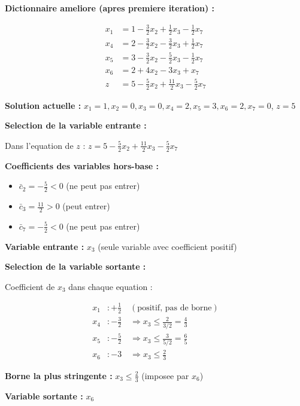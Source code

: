 \documentclass[12pt,a4paper]{article}
\begin{document}
\begin{exemple}
\textbf{Dictionnaire ameliore (apres premiere iteration) :}

\begin{align*}
x_1 &= 1 - \frac{3}{2}x_2 + \frac{1}{2}x_3 - \frac{1}{2}x_7\\
x_4 &= 2 - \frac{3}{2}x_2 - \frac{3}{2}x_3 + \frac{1}{2}x_7\\
x_5 &= 3 - \frac{3}{2}x_2 - \frac{5}{2}x_3 - \frac{1}{2}x_7\\
x_6 &= 2 + 4x_2 - 3x_3 + x_7\\
z &= 5 - \frac{5}{2}x_2 + \frac{11}{2}x_3 - \frac{5}{2}x_7
\end{align*}

\textbf{Solution actuelle :} $x_1 = 1, x_2 = 0, x_3 = 0, x_4 = 2, x_5 = 3, x_6 = 2, x_7 = 0$, $z = 5$
\end{exemple}

\begin{methode}
\textbf{Selection de la variable entrante :}

Dans l'equation de $z$ : $z = 5 - \frac{5}{2}x_2 + \frac{11}{2}x_3 - \frac{5}{2}x_7$

\textbf{Coefficients des variables hors-base :}
\begin{itemize}
    \item $\bar{c}_2 = -\frac{5}{2} < 0$ (ne peut pas entrer)
    \item $\bar{c}_3 = \frac{11}{2} > 0$ \textcolor{defvert}{(peut entrer)}
    \item $\bar{c}_7 = -\frac{5}{2} < 0$ (ne peut pas entrer)
\end{itemize}

\textbf{Variable entrante :} $x_3$ (seule variable avec coefficient positif)
\end{methode}

\begin{methode}
\textbf{Selection de la variable sortante :}

Coefficient de $x_3$ dans chaque equation :

\begin{align*}
x_1 &: +\frac{1}{2} \quad (\text{positif, pas de borne})\\
x_4 &: -\frac{3}{2} \quad \Rightarrow x_3 \leq \frac{2}{3/2} = \frac{4}{3}\\
x_5 &: -\frac{5}{2} \quad \Rightarrow x_3 \leq \frac{3}{5/2} = \frac{6}{5}\\
x_6 &: -3 \quad \Rightarrow x_3 \leq \frac{2}{3}
\end{align*}

\textbf{Borne la plus stringente :} $x_3 \leq \frac{2}{3}$ (imposee par $x_6$)

\textbf{Variable sortante :} $x_6$
\end{methode}
\end{document}
